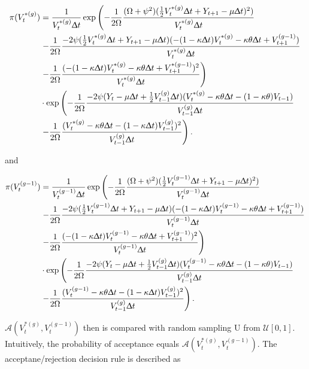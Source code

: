 \documentclass[12pt,a4paper]{article}
\numberwithin{equation}{section}
\begin{document}
\begin{align*}
\pi(V_t^{*(g)}) &= \frac{1}{V_t^{*(g)} \Updelta t} \exp \left( -\frac{1}{2 \Omega} \frac{(\Omega + \psi^2)(\frac{1}{2} V_t^{*(g)} \Updelta t + Y_{t+1} - \mu \Updelta t)^2)}{V_t^{*(g)} \Updelta t} \right.\\
& \left. -\frac{1}{2\Omega}\frac{-2\psi (\frac{1}{2}V_t^{*(g)} \Updelta t + Y_{t+1} - \mu \Updelta t)(-(1-\kappa\Updelta t) V_t^{*(g)} -\kappa \theta \Updelta t + V_{t+1}^{(g-1)})}{V_t^{*(g)} \Updelta t} \right.\\
& \left. -\frac{1}{2\Omega}\frac{(-(1-\kappa \Updelta t) V_t^{*(g)} -\kappa \theta \Updelta t + V_{t+1}^{*(g-1)})^2}{V_t^{*(g)} \Updelta t} \right)\\
& \cdot \exp \left( - \frac{1}{2 \Omega} \frac{-2 \psi (Y_t - \mu \Updelta t + \frac{1}{2}V_{t-1}^{(g)} \Updelta t)(V_t^{*(g)} - \kappa \theta \Updelta t - (1-\kappa \theta)V_{t-1})}{V_{t-1}^{(g)} \Updelta t} \right. \\
& \left. -\frac{1}{2 \Omega} \frac{(V_t^{*(g)} - \kappa \theta \Updelta t - (1-\kappa\Updelta t)V_{t-1}^{(g)})^2}{V_{t-1}^{(g)}\Updelta t}\right).
\end{align*}

and 

\begin{align*}
\pi(V_t^{(g-1)}) &= \frac{1}{V_t^{(g-1)} \Updelta t} \exp \left( -\frac{1}{2 \Omega} \frac{(\Omega + \psi^2)(\frac{1}{2} V_t^{(g-1)} \Updelta t + Y_{t+1} - \mu \Updelta t)^2)}{V_t^{(g-1)} \Updelta t} \right.\\
& \left. -\frac{1}{2\Omega}\frac{-2\psi (\frac{1}{2}V_t^{(g-1)} \Updelta t + Y_{t+1} - \mu \Updelta t)(-(1-\kappa\Updelta t) V_t^{(g-1)} -\kappa \theta \Updelta t + V_{t+1}^{(g-1)})}{V_t^{(g-1)} \Updelta t} \right.\\
& \left. -\frac{1}{2\Omega}\frac{(-(1-\kappa \Updelta t) V_t^{(g-1)} -\kappa \theta \Updelta t + V_{t+1}^{(g-1)})^2}{V_t^{(g-1)} \Updelta t} \right)\\
& \cdot \exp \left( - \frac{1}{2 \Omega} \frac{-2 \psi (Y_t - \mu \Updelta t + \frac{1}{2}V_{t-1}^{(g)} \Updelta t)(V_t^{(g-1)} - \kappa \theta \Updelta t - (1-\kappa \theta)V_{t-1})}{V_{t-1}^{(g)} \Updelta t} \right. \\
& \left. -\frac{1}{2 \Omega} \frac{(V_t^{(g-1)} - \kappa \theta \Updelta t - (1-\kappa\Updelta t)V_{t-1}^{(g)})^2}{V_{t-1}^{(g)}\Updelta t}\right).
\end{align*}

$\mathcal{A}(V_t^{*(g)}, V_t^{(g-1)})$ then is compared with random sampling U from $\mathcal{U}[0, 1]$. Intuitively, the probability of acceptance equals $\mathcal{A}(V_t^{*(g)}, V_t^{(g-1)})$. The acceptane/rejection decision rule is described as
\end{document}
